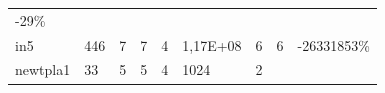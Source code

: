 \documentclass[
]{book}
\begin{document}
\begin{longtable}[]{@{}lllllllll@{}}
\begin{minipage}[t]{0.07\columnwidth}
-29\%\strut
\end{minipage}\tabularnewline
\begin{minipage}[t]{0.07\columnwidth}\raggedright
in5\strut
\end{minipage} & \begin{minipage}[t]{0.11\columnwidth}\raggedright
446\strut
\end{minipage} & \begin{minipage}[t]{0.08\columnwidth}\raggedright
7\strut
\end{minipage} & \begin{minipage}[t]{0.07\columnwidth}\raggedright
7\strut
\end{minipage} & \begin{minipage}[t]{0.09\columnwidth}\raggedright
4\strut
\end{minipage} & \begin{minipage}[t]{0.12\columnwidth}\raggedright
1,17E+08\strut
\end{minipage} & \begin{minipage}[t]{0.08\columnwidth}\raggedright
6\strut
\end{minipage} & \begin{minipage}[t]{0.07\columnwidth}\raggedright
6\strut
\end{minipage} & \begin{minipage}[t]{0.07\columnwidth}\raggedright
-26331853\%\strut
\end{minipage}\tabularnewline
\begin{minipage}[t]{0.07\columnwidth}\raggedright
newtpla1\strut
\end{minipage} & \begin{minipage}[t]{0.11\columnwidth}\raggedright
33\strut
\end{minipage} & \begin{minipage}[t]{0.08\columnwidth}\raggedright
5\strut
\end{minipage} & \begin{minipage}[t]{0.07\columnwidth}\raggedright
5\strut
\end{minipage} & \begin{minipage}[t]{0.09\columnwidth}\raggedright
4\strut
\end{minipage} & \begin{minipage}[t]{0.12\columnwidth}\raggedright
1024\strut
\end{minipage} & \begin{minipage}[t]{0.08\columnwidth}\raggedright
2\strut
\end{minipage} & \begin{minipage}[t]{0.07\columnwidth}\raggedright

\end{minipage}
\end{longtable}
\end{document}
